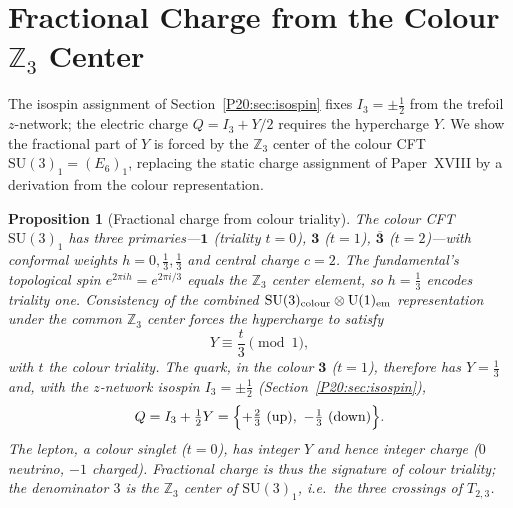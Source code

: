\documentclass[11pt,a4paper]{article}
\newtheorem{proposition}[theorem]{Proposition}
\theoremstyle{definition}\newtheorem{definition}[theorem]{Definition}
\theoremstyle{remark}
\newcommand{\SU}{\mathrm{SU}}
\newcommand{\Zthree}{\mathbb{Z}_3}
\begin{document}
\section{Fractional Charge from the Colour $\Zthree$ Center}
\label{P20:sec:charge}

The isospin assignment of Section~\ref{P20:sec:isospin} fixes
$I_3=\pm\tfrac12$ from the trefoil $z$-network; the electric charge
$Q=I_3+Y/2$ requires the hypercharge $Y$. We show the fractional part of
$Y$ is forced by the $\Zthree$ center of the colour CFT
$\SU(3)_1=(E_6)_1$, replacing the static charge assignment of
Paper~XVIII by a derivation from the colour representation.

\begin{proposition}[Fractional charge from colour triality]
\label{P20:prop:frac_charge}
The colour CFT $\SU(3)_1$ has three primaries---$\mathbf{1}$
(triality $t=0$), $\mathbf{3}$ ($t=1$), $\overline{\mathbf{3}}$
($t=2$)---with conformal weights $h=0,\tfrac13,\tfrac13$ and central
charge $c=2$. The fundamental's topological spin
$e^{2\pi i h}=e^{2\pi i/3}$ equals the $\Zthree$ center element, so
$h=\tfrac13$ encodes triality one. Consistency of the combined
$\SU(3)_{\rm colour}\otimes\mathrm{U}(1)_{\rm em}$ representation under
the common $\Zthree$ center forces the hypercharge to satisfy
\begin{equation}
  Y\equiv \frac{t}{3}\pmod 1,
  \label{P20:eq:Y_triality}
\end{equation}
with $t$ the colour triality. The quark, in the colour $\mathbf{3}$
($t=1$), therefore has $Y=\tfrac13$ and, with the $z$-network isospin
$I_3=\pm\tfrac12$ (Section~\ref{P20:sec:isospin}),
\begin{equation}
  Q=I_3+\tfrac12 Y
   =\Bigl\{+\tfrac23\ (\text{up}),\ -\tfrac13\ (\text{down})\Bigr\}.
\end{equation}
The lepton, a colour singlet ($t=0$), has integer $Y$ and hence integer
charge ($0$ neutrino, $-1$ charged). Fractional charge is thus the
signature of colour triality; the denominator $3$ is the $\Zthree$
center of $\SU(3)_1$, i.e.\ the three crossings of $T_{2,3}$.
\end{proposition}
\end{document}
